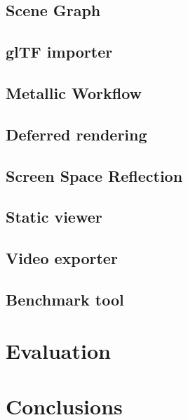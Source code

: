 \documentclass[11pt,a4paper]{report}
\begin{document}
\section{Scene Graph}

\section{glTF importer}

\section{Metallic Workflow}

\section{Deferred rendering}

\section{Screen Space Reflection}

\section{Static viewer}

\section{Video exporter}

\section{Benchmark tool}

\chapter{Evaluation}

\chapter{Conclusions}
\end{document}

